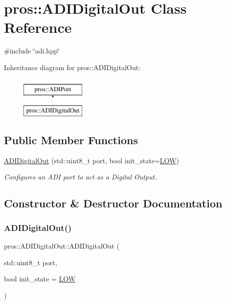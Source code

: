 \hypertarget{classpros_1_1ADIDigitalOut}{}\section{pros\+:\+:A\+D\+I\+Digital\+Out Class Reference}
\label{classpros_1_1ADIDigitalOut}


{\ttfamily \#include \char`\"{}adi.\+hpp\char`\"{}}

Inheritance diagram for pros\+:\+:A\+D\+I\+Digital\+Out\+:\begin{figure}[H]
\begin{center}
\leavevmode
\includegraphics[height=2.000000cm]{classpros_1_1ADIDigitalOut}
\end{center}
\end{figure}
\subsection*{Public Member Functions}
\begin{DoxyCompactItemize}
\item 
\hyperlink{classpros_1_1ADIDigitalOut_a1c5dbea7f767418550df8007cfb0d221}{A\+D\+I\+Digital\+Out} (std\+::uint8\+\_\+t port, bool init\+\_\+state=\hyperlink{adi_8h_ab811d8c6ff3a505312d3276590444289}{L\+OW})
\begin{DoxyCompactList}\small\item\em Configures an A\+DI port to act as a Digital Output. \end{DoxyCompactList}\end{DoxyCompactItemize}


\subsection{Constructor \& Destructor Documentation}
\mbox{\label{classpros_1_1ADIDigitalOut_a1c5dbea7f767418550df8007cfb0d221}} 
\subsubsection{\texorpdfstring{A\+D\+I\+Digital\+Out()}{ADIDigitalOut()}}
{\footnotesize\ttfamily pros\+::\+A\+D\+I\+Digital\+Out\+::\+A\+D\+I\+Digital\+Out (\begin{DoxyParamCaption}\item[{std\+::uint8\+\_\+t}]{port,  }\item[{bool}]{init\+\_\+state = {\ttfamily \hyperlink{adi_8h_ab811d8c6ff3a505312d3276590444289}{L\+OW}} }\end{DoxyParamCaption})}



